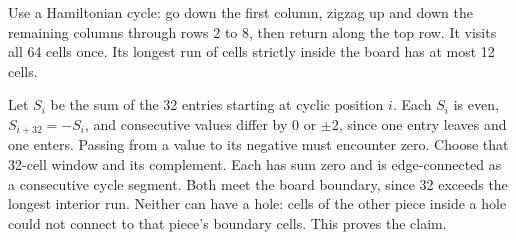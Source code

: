 Use a Hamiltonian cycle: go down the first column, zigzag up and down the remaining columns through rows 2 to 8, then return along the top row. It visits all 64 cells once. Its longest run of cells strictly inside the board has at most 12 cells.

Let $S_i$ be the sum of the 32 entries starting at cyclic position $i$. Each $S_i$ is even, $S_{i+32}=-S_i$, and consecutive values differ by $0$ or $\pm2$, since one entry leaves and one enters. Passing from a value to its negative must encounter zero. Choose that 32-cell window and its complement. Each has sum zero and is edge-connected as a consecutive cycle segment. Both meet the board boundary, since 32 exceeds the longest interior run. Neither can have a hole: cells of the other piece inside a hole could not connect to that piece's boundary cells. This proves the claim.
